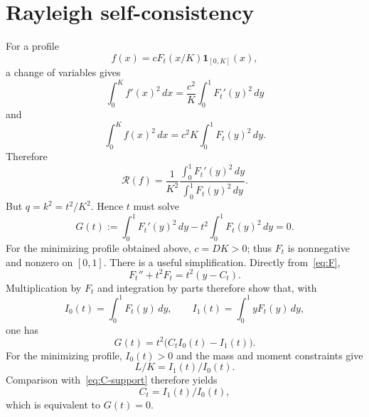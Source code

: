 \documentclass[11pt]{amsart}
\theoremstyle{definition}
\theoremstyle{remark}
\newcommand{\Rcal}{\mathcal R}
\begin{document}
\section{Rayleigh self-consistency}
For a profile
\[
 f(x)=cF_t(x/K)\mathbf1_{[0,K]}(x),
\]
a change of variables gives
\[
 \int_0^K f'(x)^2\,dx
 =\frac{c^2}{K}\int_0^1F_t'(y)^2\,dy
\]
and
\[
 \int_0^K f(x)^2\,dx
 =c^2K\int_0^1F_t(y)^2\,dy.
\]
Therefore
\[
 \Rcal(f)=\frac{1}{K^2}
 \frac{\int_0^1F_t'(y)^2\,dy}{\int_0^1F_t(y)^2\,dy}.
\]
But $q=k^2=t^2/K^2$. Hence $t$ must solve
\begin{equation}\label{eq:G}
 G(t):=\int_0^1F_t'(y)^2\,dy
 -t^2\int_0^1F_t(y)^2\,dy=0.
\end{equation}
For the minimizing profile obtained above, $c=DK>0$; thus $F_t$ is
nonnegative and nonzero on $[0,1]$.
There is a useful simplification. Directly from~\eqref{eq:F},
\[
 F_t''+t^2F_t=t^2(y-C_t).
\]
Multiplication by $F_t$ and integration by parts therefore show that, with
\[
 I_0(t)=\int_0^1F_t(y)\,dy,
 \qquad I_1(t)=\int_0^1yF_t(y)\,dy,
\]
one has
\begin{equation}\label{eq:G-moment}
 G(t)=t^2\bigl(C_tI_0(t)-I_1(t)\bigr).
\end{equation}
For the minimizing profile, $I_0(t)>0$ and the mass and moment constraints give
\[
 L/K=I_1(t)/I_0(t).
\]
Comparison with~\eqref{eq:C-support} therefore yields
\[
 C_t=I_1(t)/I_0(t),
\]
which is equivalent to $G(t)=0$.
\end{document}
